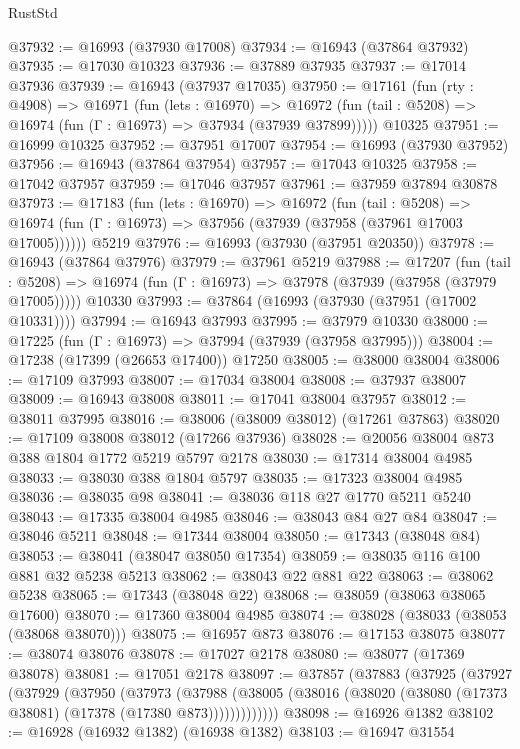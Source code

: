 \begin{lexlean}{RustStd}
\begin{coremodule}
@37932 := @16993 (@37930 @17008)
@37934 := @16943 (@37864 @37932)
@37935 := @17030 @10323
@37936 := @37889 @37935
@37937 := @17014 @37936
@37939 := @16943 (@37937 @17035)
@37950 := @17161
    (fun (rty : @4908) =>
    @16971
      (fun (lets : @16970) =>
      @16972 (fun (tail : @5208) => @16974 (fun (Γ : @16973) => @37934 (@37939 @37899)))))
    @10325
@37951 := @16999 @10325
@37952 := @37951 @17007
@37954 := @16993 (@37930 @37952)
@37956 := @16943 (@37864 @37954)
@37957 := @17043 @10325
@37958 := @17042 @37957
@37959 := @17046 @37957
@37961 := @37959 @37894 @30878
@37973 := @17183
    (fun (lets : @16970) =>
    @16972
      (fun (tail : @5208) =>
      @16974 (fun (Γ : @16973) => @37956 (@37939 (@37958 (@37961 @17003 @17005))))))
    @5219
@37976 := @16993 (@37930 (@37951 @20350))
@37978 := @16943 (@37864 @37976)
@37979 := @37961 @5219
@37988 := @17207
    (fun (tail : @5208) => @16974 (fun (Γ : @16973) => @37978 (@37939 (@37958 (@37979 @17005)))))
    @10330
@37993 := @37864 (@16993 (@37930 (@37951 (@17002 @10331))))
@37994 := @16943 @37993
@37995 := @37979 @10330
@38000 := @17225 (fun (Γ : @16973) => @37994 (@37939 (@37958 @37995)))
@38004 := @17238 (@17399 (@26653 @17400)) @17250
@38005 := @38000 @38004
@38006 := @17109 @37993
@38007 := @17034 @38004
@38008 := @37937 @38007
@38009 := @16943 @38008
@38011 := @17041 @38004 @37957
@38012 := @38011 @37995
@38016 := @38006 (@38009 @38012) (@17261 @37863)
@38020 := @17109 @38008 @38012 (@17266 @37936)
@38028 := @20056 @38004 @873 @388 @1804 @1772 @5219 @5797 @2178
@38030 := @17314 @38004 @4985
@38033 := @38030 @388 @1804 @5797
@38035 := @17323 @38004 @4985
@38036 := @38035 @98
@38041 := @38036 @118 @27 @1770 @5211 @5240
@38043 := @17335 @38004 @4985
@38046 := @38043 @84 @27 @84
@38047 := @38046 @5211
@38048 := @17344 @38004
@38050 := @17343 (@38048 @84)
@38053 := @38041 (@38047 @38050 @17354)
@38059 := @38035 @116 @100 @881 @32 @5238 @5213
@38062 := @38043 @22 @881 @22
@38063 := @38062 @5238
@38065 := @17343 (@38048 @22)
@38068 := @38059 (@38063 @38065 @17600)
@38070 := @17360 @38004 @4985
@38074 := @38028 (@38033 (@38053 (@38068 @38070)))
@38075 := @16957 @873
@38076 := @17153 @38075
@38077 := @38074 @38076
@38078 := @17027 @2178
@38080 := @38077 (@17369 @38078)
@38081 := @17051 @2178
@38097 := @37857
    (@37883
      (@37925
        (@37927
          (@37929
            (@37950
              (@37973
                (@37988
                  (@38005 (@38016 (@38020 (@38080 (@17373 @38081) (@17378 (@17380 @873)))))))))))))
@38098 := @16926 @1382
@38102 := @16928 (@16932 @1382) (@16938 @1382)
@38103 := @16947 @31554

\end{coremodule}
\end{lexlean}

